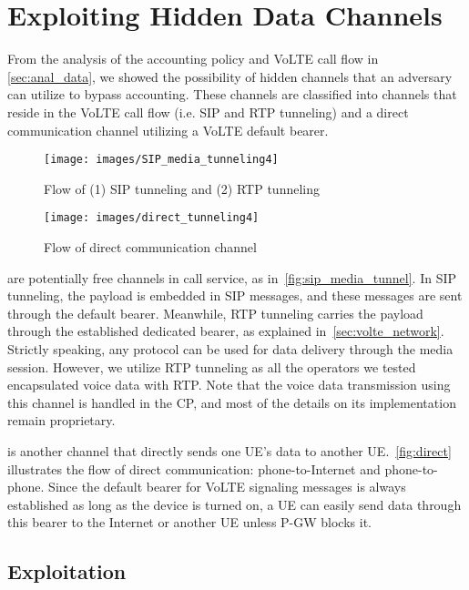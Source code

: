 \chapter{Exploiting Hidden Data Channels}
\label{sec:accounting}

From the analysis of the accounting policy and VoLTE call flow in
\autoref{sec:anal_data}, we showed the possibility of hidden channels
that an adversary can utilize to bypass accounting. These channels are classified
into channels that reside in the VoLTE call flow (i.e. SIP and RTP tunneling) and a
direct communication channel utilizing a VoLTE default bearer.

\begin{figure}[b!]
  \centering
  \texttt{[image: images/SIP\_media\_tunneling4]}
  \caption{Flow of (1) SIP tunneling and (2) RTP tunneling}
  \label{fig:sip_media_tunnel}
  \texttt{[image: images/direct\_tunneling4]}
  \caption{Flow of direct communication channel}
  \label{fig:direct}
\end{figure}



 are potentially free
channels in \vt call service, as in~\autoref{fig:sip_media_tunnel}. 
In SIP tunneling, the payload is embedded in SIP messages, and these
messages are sent through the default bearer. Meanwhile,  RTP tunneling
carries the payload through the established dedicated bearer, as
explained in~\autoref{sec:volte_network}.
Strictly speaking, any protocol can be used for data delivery through the media
session. However, we utilize RTP tunneling as all the operators we tested
encapsulated voice data with RTP.
Note that the voice data transmission using this channel is handled in the CP, and most of the details on its implementation
remain proprietary.

 is another channel that directly sends one UE's
data to another UE.~\autoref{fig:direct} illustrates the flow of direct
communication:  phone-to-Internet and  phone-to-phone. Since the default
bearer for VoLTE signaling messages is always established as long as the device
is turned on, a UE can easily send data through this bearer to the Internet or another UE unless
P-GW blocks it.

\section{Exploitation}
\label{sec:impl}


